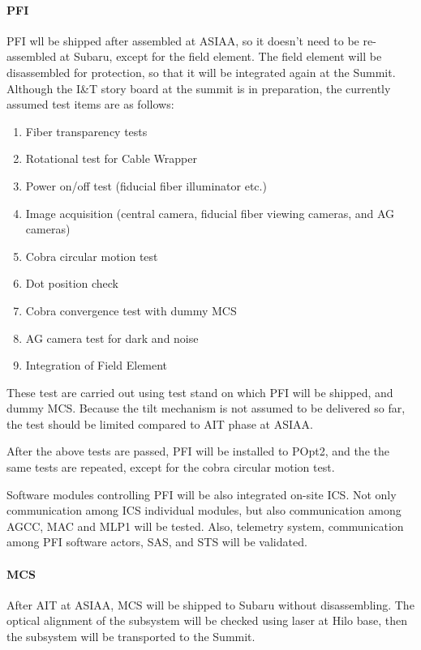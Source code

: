 \paragraph{PFI}
PFI wll be shipped after assembled at ASIAA, so it doesn't need to be re-assembled at Subaru, except for the field element.
The field element will be disassembled for protection, so that it will be integrated again at the Summit.
Although the I\&T story board at the summit is in preparation, the currently assumed test items are as follows:
\begin{enumerate}
\item Fiber transparency tests
\item Rotational test for Cable Wrapper
\item Power on/off test (fiducial fiber illuminator etc.)
\item Image acquisition (central camera, fiducial fiber viewing cameras, and AG cameras)
\item Cobra circular motion test
\item Dot position check
\item Cobra convergence test with dummy MCS
\item AG camera test for dark and noise
\item Integration of Field Element
\end{enumerate}
These test are carried out using test stand on which PFI will be shipped, and dummy MCS.
Because the tilt mechanism is not assumed to be delivered so far, the test should be limited compared to AIT phase at ASIAA.

After the above tests are passed, PFI will be installed to POpt2, and the the same tests are repeated, except for the cobra circular motion test.

Software modules controlling PFI will be also integrated on-site ICS.
Not only communication among ICS individual modules, but also communication among AGCC, MAC and MLP1 will be tested.
Also, telemetry system, communication among PFI software actors, SAS, and STS will be validated.

\paragraph{MCS}
After AIT at ASIAA, MCS will be shipped to Subaru without disassembling.
The optical alignment of the subsystem will be checked using laser at Hilo base, then the subsystem will be transported to the Summit.

